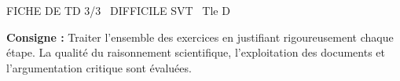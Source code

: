 \documentclass[11pt]{article}
\begin{document}
\begin{tcolorbox}[enhanced,colback=popink,colframe=popink,arc=10pt,boxrule=0pt,left=12pt,right=12pt,top=9pt,bottom=9pt]
{\color{white}\popxbold\small FICHE DE TD 3/3 \textbullet\ DIFFICILE \hfill SVT \textbullet\ Tle D\par}
\end{tcolorbox}
\vspace{4pt}
\noindent\textbf{Consigne :} Traiter l'ensemble des exercices en justifiant rigoureusement chaque étape. La qualité du raisonnement scientifique, l'exploitation des documents et l'argumentation critique sont évaluées.
\end{document}
